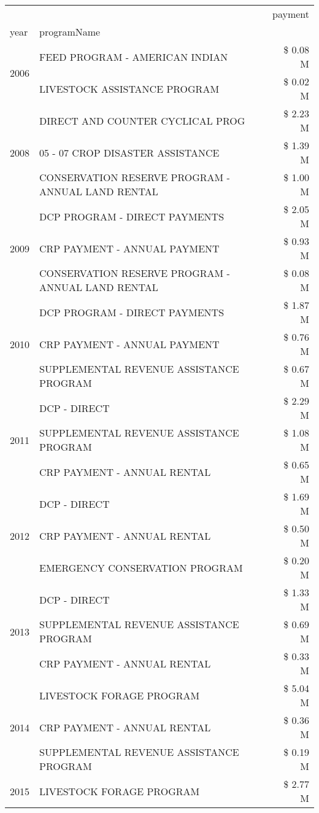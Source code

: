 \begin{tabular}{llr}
\toprule
 &  & payment \\
year & programName &  \\
\midrule
\multirow[t]{2}{*}{2006} & FEED PROGRAM - AMERICAN INDIAN & \$ 0.08 M \\
 & LIVESTOCK ASSISTANCE PROGRAM & \$ 0.02 M \\
\cline{1-3}
\multirow[t]{3}{*}{2008} & DIRECT AND COUNTER CYCLICAL PROG & \$ 2.23 M \\
 & 05 - 07 CROP DISASTER ASSISTANCE & \$ 1.39 M \\
 & CONSERVATION RESERVE PROGRAM - ANNUAL LAND RENTAL & \$ 1.00 M \\
\cline{1-3}
\multirow[t]{3}{*}{2009} & DCP PROGRAM - DIRECT PAYMENTS & \$ 2.05 M \\
 & CRP PAYMENT - ANNUAL PAYMENT & \$ 0.93 M \\
 & CONSERVATION RESERVE PROGRAM - ANNUAL LAND RENTAL & \$ 0.08 M \\
\cline{1-3}
\multirow[t]{3}{*}{2010} & DCP PROGRAM - DIRECT PAYMENTS & \$ 1.87 M \\
 & CRP PAYMENT - ANNUAL PAYMENT & \$ 0.76 M \\
 & SUPPLEMENTAL REVENUE ASSISTANCE PROGRAM & \$ 0.67 M \\
\cline{1-3}
\multirow[t]{3}{*}{2011} & DCP - DIRECT & \$ 2.29 M \\
 & SUPPLEMENTAL REVENUE ASSISTANCE PROGRAM & \$ 1.08 M \\
 & CRP PAYMENT - ANNUAL RENTAL & \$ 0.65 M \\
\cline{1-3}
\multirow[t]{3}{*}{2012} & DCP - DIRECT & \$ 1.69 M \\
 & CRP PAYMENT - ANNUAL RENTAL & \$ 0.50 M \\
 & EMERGENCY CONSERVATION PROGRAM & \$ 0.20 M \\
\cline{1-3}
\multirow[t]{3}{*}{2013} & DCP - DIRECT & \$ 1.33 M \\
 & SUPPLEMENTAL REVENUE ASSISTANCE PROGRAM & \$ 0.69 M \\
 & CRP PAYMENT - ANNUAL RENTAL & \$ 0.33 M \\
\cline{1-3}
\multirow[t]{3}{*}{2014} & LIVESTOCK FORAGE PROGRAM & \$ 5.04 M \\
 & CRP PAYMENT - ANNUAL RENTAL & \$ 0.36 M \\
 & SUPPLEMENTAL REVENUE ASSISTANCE PROGRAM & \$ 0.19 M \\
\cline{1-3}
\multirow[t]{3}{*}{2015} & LIVESTOCK FORAGE PROGRAM & \$ 2.77 M \\

\end{tabular}
